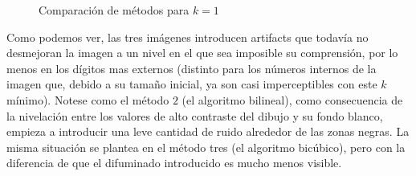 \begin{figure}[H]
    \centering
    \qquad
    \qquad
    \caption{Comparación de métodos para $k = 1$}
    \label{fig:example}
\end{figure}

Como podemos ver, las tres imágenes introducen artifacts que todavía no desmejoran la imagen a un nivel en el que sea imposible su comprensión, por lo menos en los dígitos mas externos (distinto para los números internos de la imagen que, debido a su tamaño inicial, ya son casi imperceptibles con este $k$ mínimo). Notese como el método $2$ (el algoritmo bilineal), como consecuencia de la nivelación entre los valores de alto contraste del dibujo y su fondo blanco, empieza a introducir una leve cantidad de ruido alrededor de las zonas negras. La misma situación se plantea en el método tres (el algoritmo bicúbico), pero con la diferencia de que el difuminado introducido es mucho menos visible.


